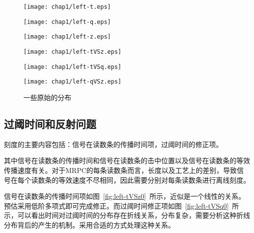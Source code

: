 \begin{figure}[htbp]
\begin{minipage}[t]{0.33\linewidth}
\texttt{[image: chap1/left-t.eps]}
\label{fig:left-t0}
\end{minipage}%
\hfill
\begin{minipage}[t]{0.33\linewidth}
\texttt{[image: chap1/left-q.eps]}
\label{fig:left-q0}
\end{minipage}
\hfill
\begin{minipage}[t]{0.33\linewidth}
\texttt{[image: chap1/left-z.eps]}
\label{fig:left-z0}
\end{minipage}
\vfill
\begin{minipage}[t]{0.33\linewidth}
\texttt{[image: chap1/left-tVSz.eps]}
\label{fig:left-tVSz0}
\end{minipage}%
\hfill
\begin{minipage}[t]{0.33\linewidth}
\texttt{[image: chap1/left-tVSq.eps]}
\label{fig:left-tVSq0}
\end{minipage}
\hfill
\begin{minipage}[t]{0.33\linewidth}
\texttt{[image: chap1/left-qVSz.eps]}
\label{fig:left-qVSz0}
\end{minipage}
\caption{一些原始的分布}
\label{fig:some-Diagram}
\end{figure}

\subsection{过阈时间和反射问题}
刻度的主要内容包括：信号在读数条的传播时间项，过阈时间的修正项。

其中信号在读数条的传播时间和信号在读数条的击中位置以及信号在读数条的等效传播速度有关。对于MRPC的每条读数条而言，长度以及工艺上的差别，导致信号在每个读数条的等效速度不尽相同，因此需要分别对每条读数条进行离线刻度。

信号在读数条的传播时间项如图~\ref{fig:left-tVSz0}~所示，近似是一个线性的关系。预估采用低阶多项式即可完成修正。而过阈时间修正项如图~\ref{fig:left-tVSq0}~所示，可以看出时间对过阈时间的分布存在折线关系，分布复杂，需要分析这种折线分布背后的产生的机制。采用合适的方式处理这种关系。

